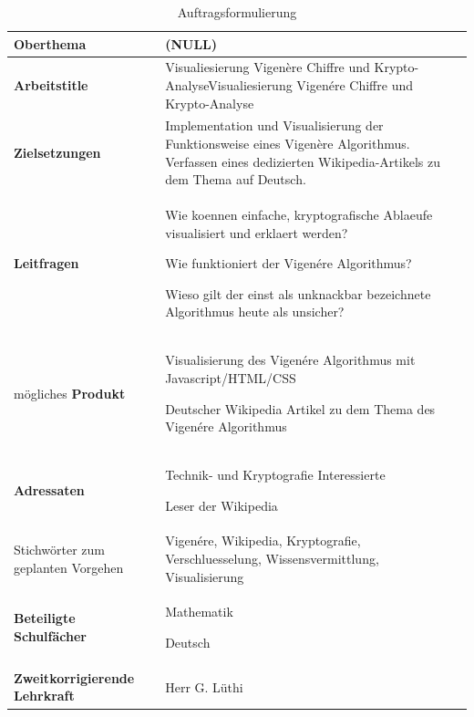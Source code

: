 \documentclass[11pt,paper=a4,final]{scrartcl}
\begin{document}
\begin{table}[h!]
  \centering
  \begin{tabular}{|p{4cm}|p{12cm}|}\hline
    \bf Oberthema & (NULL) \\ \hline
    \bf Arbeitstitle & Visualiesierung Vigenère Chiffre und
    Krypto-AnalyseVisualiesierung Vigen\'ere Chiffre und Krypto-Analyse \\
    \hline
    \bf Zielsetzungen & Implementation und Visualisierung der Funktionsweise
    eines Vigenère Algorithmus. Verfassen eines dedizierten Wikipedia-Artikels
    zu dem Thema auf Deutsch. \\ \hline
    \bf Leitfragen & \begin{itemize*} \item Wie koennen einfache, kryptografische
    Ablaeufe visualisiert und erklaert werden? \item Wie funktioniert der
    Vigen\'ere Algorithmus? \item Wieso gilt der einst als unknackbar
    bezeichnete Algorithmus heute als unsicher? \end{itemize*} \\ \hline
    m\"ogliches \bf Produkt & \begin{itemize*} \item Visualisierung des Vigen\'ere
    Algorithmus mit Javascript/HTML/CSS \item Deutscher Wikipedia Artikel zu dem
    Thema des Vigen\'ere Algorithmus \end{itemize*} \\ \hline
    \bf Adressaten & \begin{itemize*} \item Technik- und Kryptografie
    Interessierte \item Leser der Wikipedia \end{itemize*} \\ \hline
    Stichwörter zum geplanten Vorgehen & Vigen\'ere, Wikipedia, Kryptografie,
    Verschluesselung, Wissensvermittlung, Visualisierung \\ \hline
    \bf Beteiligte Schulf\"acher & \begin{itemize*} \item Mathematik \item
    Deutsch \end{itemize*} \\ \hline
    \bf Zweitkorrigierende Lehrkraft & Herr G. L\"uthi \\ \hline
  \end{tabular}
  \caption{Auftragsformulierung}
  \label{tab:auftrag}
\end{table}
\newpage
\end{document}
